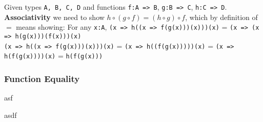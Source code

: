 \documentclass[9pt]{article} %
\begin{document}
Given types \texttt{A, B, C, D} and functions \texttt{f:A => B}, \texttt{g:B => C}, \texttt{h:C => D}.\newline
\\
\noindent \textbf{Associativity} we need to show $h \circ (g \circ f) = (h \circ g) \circ f$, which by definition of $=$ means showing:\newline
\noindent For any \texttt{x:A}, \texttt{(x => h((x => f(g(x)))(x)))(x)} = \texttt{(x => (x => h(g(x)))(f(x)))(x)}\newline
\\
\noindent \texttt{(x => h((x => f(g(x)))(x)))(x)} = \texttt{(x => h((f(g(x)))))(x)} \newline
\hspace{4cm} = \texttt{(x => h(f(g(x))))(x)} \newline
\hspace{4cm} = \texttt{h(f(g(x)))} \newline




\subsubsection{Function Equality}

asf



asdf
\end{document}
